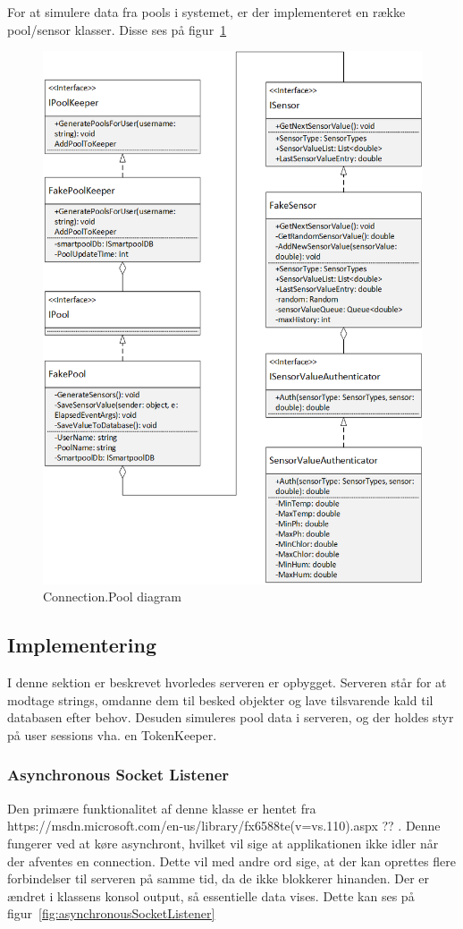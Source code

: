 For at simulere data fra pools i systemet, er der implementeret en række pool/sensor klasser. Disse ses på figur~\ref{fig:ConnectionPool}
\begin{figure}
\centering
\includegraphics[width=0.8\linewidth]{figs/connection/ConnectionPool.png}
\caption{Connection.Pool diagram}
\label{fig:ConnectionPool}
\end{figure}

\subsection{Implementering}
I denne sektion er beskrevet hvorledes serveren er opbygget. Serveren står for at modtage strings, omdanne dem til besked objekter og lave tilsvarende kald til databasen efter behov. Desuden simuleres pool data i serveren, og der holdes styr på user sessions vha. en TokenKeeper. 

\subsubsection{Asynchronous Socket Listener}
Den primære funktionalitet af denne klasse er hentet fra https://msdn.microsoft.com/en-us/library/fx6588te(v=vs.110).aspx ?? . Denne fungerer ved at køre asynchront, hvilket vil sige at applikationen ikke idler når der afventes en connection. Dette vil med andre ord sige, at der kan oprettes flere forbindelser til serveren på samme tid, da de ikke blokkerer hinanden.
Der er ændret i klassens konsol output, så essentielle data vises. Dette kan ses på figur~\ref{fig:asynchronousSocketListener}

